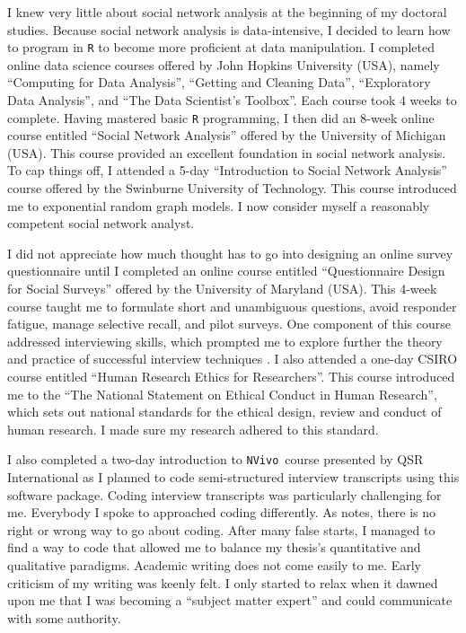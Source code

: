 \documentclass[12pt,table,xcdraw]{book}
\begin{document}
I knew very little about social network analysis at the beginning of my doctoral studies. Because social network analysis is data-intensive, I decided to learn how to program in \texttt{R} to become more proficient at data manipulation. I completed online data science courses offered by John Hopkins University (USA), namely \enquote{Computing for Data Analysis}, \enquote{Getting and Cleaning Data}, \enquote{Exploratory Data Analysis}, and \enquote{The Data Scientist's Toolbox}. Each course took 4 weeks to complete. Having mastered basic \texttt{R} programming, I then did an 8-week online course entitled \enquote{Social Network Analysis} offered by the University of Michigan (USA). This course provided an excellent foundation in social network analysis. To cap things off, I attended a 5-day \enquote{Introduction to Social Network Analysis} course offered by the Swinburne University of Technology. This course introduced me to exponential random graph models. I now consider myself a reasonably competent social network analyst. \medskip

I did not appreciate how much thought has to go into designing an online survey questionnaire until I completed an online course entitled \enquote{Questionnaire Design for Social Surveys} offered by the University of Maryland (USA). This 4-week course taught me to formulate short and unambiguous questions, avoid responder fatigue, manage selective recall, and pilot surveys. One component of this course addressed interviewing skills, which prompted me to explore further the theory and practice of successful interview techniques \citep[e.g.][]{kvale2008doing,seidman2012interviewing}. I also attended a one-day CSIRO course entitled \enquote{Human Research Ethics for Researchers}. This course introduced me to the \enquote{The National Statement on Ethical Conduct in Human Research}, which sets out national standards for the ethical design, review and conduct of human research. I made sure my research adhered to this standard. \medskip

I also completed a two-day introduction to \texttt{NVivo}\texttrademark\ course presented by QSR International as I planned to code semi-structured interview transcripts using this software package. Coding interview transcripts was particularly challenging for me. Everybody I spoke to approached coding differently. As \citet{saldana2015coding} notes, there is no right or wrong way to go about coding. After many false starts, I managed to find a way to code that allowed me to balance my thesis's quantitative and qualitative paradigms. Academic writing does not come easily to me. Early criticism of my writing was keenly felt. I only started to relax when it dawned upon me that I was becoming a \enquote{subject matter expert} and could communicate with some authority. \medskip
\end{document}
